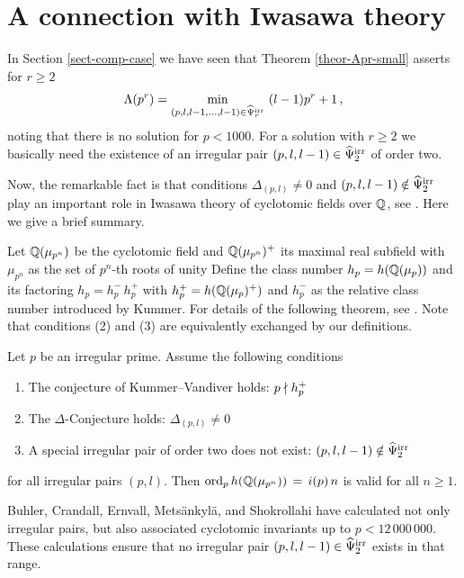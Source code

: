 \documentclass[12pt,english]{article}
\begin{document}
\section{A connection with Iwasawa theory}
\setcounter{equation}{0}

In Section \ref{sect-comp-case} we have seen that
Theorem \ref{theor-Apr-small} asserts for $r \geq 2$
\[
   \Lambda(p^r) = \min_{(p,l,l-1,\ldots,l-1) \in \widehat{\Psi}^{\rm irr}_r} \ (l-1)p^r+1 \,,
\]
noting that there is no solution for $p < 1000$. For a solution with $r \geq 2$
we basically need the existence of an irregular pair $(p,l,l-1) \in \widehat{\Psi}^{\rm irr}_2$ of order two.
\medskip

Now, the remarkable fact is that conditions $\Delta_{(p,l)} \neq 0$
and $(p,l,l-1) \notin \widehat{\Psi}^{\rm irr}_2$ play an important role in Iwasawa theory of
cyclotomic fields over $\mathbb{Q}$, see \cite[Section 6]{kellner04irrpowbn}.
Here we give a brief summary.
\medskip

Let $\mathbb{Q}(\mu_{p^n})$ be the cyclotomic field and  $\mathbb{Q}(\mu_{p^n})^+$
its maximal real subfield with $\mu_{p^n}$ as the set of $p^n$-th roots of unity
Define the class number $h_p = h(\mathbb{Q}(\mu_p))$ and its factoring $h_p = h_p^- \, h_p^+$
with $h_p^+ = h(\mathbb{Q}(\mu_{p})^+)$ and $h_p^-$ as
the relative class number introduced by Kummer.
For details of the following theorem,
see \cite[Corollary 10.17, p.~202]{washington97cyclo}.
Note that conditions (2) and (3) are equivalently exchanged by our definitions.

\begin{theorem}
Let $p$ be an irregular prime. Assume the following conditions
\begin{enumerate}
\item The conjecture of Kummer--Vandiver holds: $p \nmid h_p^+$
\item The $\Delta$-Conjecture holds: $\Delta_{(p,l)} \neq 0$
\item A special irregular pair of order two does not exist: $(p,l,l-1) \notin \widehat{\Psi}^{\rm irr}_2$
\end{enumerate}
for all irregular pairs $(p,l)$. Then
$\mathop{\rm ord}\nolimits_p h( \mathbb{Q}( \mu_{p^n} ) ) \, = \, i(p) \, n $ is valid for all $n \geq 1$.
\end{theorem}


Buhler, Crandall, Ernvall, Mets\"ankyl\"a, and Shokrollahi \cite{irrprime12M}
have calculated not only irregular pairs, but also associated
cyclotomic invariants up to $p < 12\,000\,000$. These calculations ensure that
no irregular pair $(p,l,l-1) \in \widehat{\Psi}^{\rm irr}_2$ exists in that range.
\medskip
\end{document}
